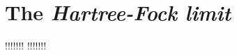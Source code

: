 \documentclass[../../master.tex]{subfiles}
\begin{document}
\section{The \emph{Hartree-Fock limit} \label{HFlimit}}


!!!!!!!
!!!!!!!















 
\end{document}

